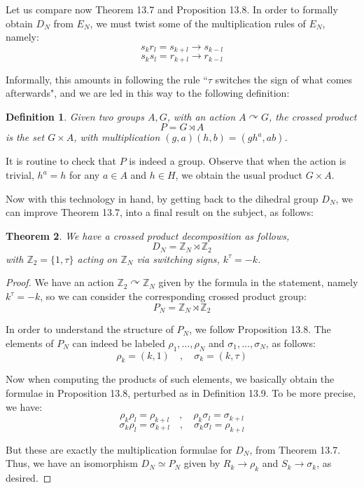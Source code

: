 \documentclass[12pt]{amsbook}
\newtheorem{theorem}{Theorem}[chapter]
\newtheorem{definition}[theorem]{Definition}
\begin{document}
Let us compare now Theorem 13.7 and Proposition 13.8. In order to formally obtain $D_N$ from $E_N$, we must twist some of the multiplication rules of $E_N$, namely:
$$s_kr_l=s_{k+l}\to s_{k-l}$$
$$s_ks_l=r_{k+l}\to r_{k-l}$$

Informally, this amounts in following the rule ``$\tau$ switches the sign of what comes afterwards", and we are led in this way to the following definition:


\begin{definition}
Given two groups $A,G$, with an action $A\curvearrowright G$, the crossed product
$$P=G\rtimes A$$
is the set $G\times A$, with multiplication $(g,a)(h,b)=(gh^a,ab)$.
\end{definition}

It is routine to check that $P$ is indeed a group. Observe that when the action is trivial, $h^a=h$ for any $a\in A$ and $h\in H$, we obtain the usual product $G\times A$. 

\bigskip

Now with this technology in hand, by getting back to the dihedral group $D_N$, we can improve Theorem 13.7, into a final result on the subject, as follows:


\begin{theorem}
We have a crossed product decomposition as follows,
$$D_N=\mathbb Z_N\rtimes\mathbb Z_2$$
with $\mathbb Z_2=\{1,\tau\}$ acting on $\mathbb Z_N$ via switching signs, $k^\tau=-k$.
\end{theorem}

\begin{proof}
We have an action $\mathbb Z_2\curvearrowright\mathbb Z_N$ given by the formula in the statement, namely $k^\tau=-k$, so we can consider the corresponding crossed product group:
$$P_N=\mathbb Z_N\rtimes\mathbb Z_2$$

In order to understand the structure of $P_N$, we follow Proposition 13.8. The elements of $P_N$ can indeed be labeled $\rho_1,\ldots,\rho_N$ and $\sigma_1,\ldots,\sigma_N$, as follows:
$$\rho_k=(k,1)\quad,\quad 
\sigma_k=(k,\tau)$$

Now when computing the products of such elements, we basically obtain the formulae in Proposition 13.8, perturbed as in Definition 13.9. To be more precise, we have:
$$\rho_k\rho_l=\rho_{k+l}\quad,\quad 
\rho_k\sigma_l=\sigma_{k+l}$$
$$\sigma_k\rho_l=\sigma_{k+l}\quad,\quad
\sigma_k\sigma_l=\rho_{k+l}$$

But these are exactly the multiplication formulae for $D_N$, from Theorem 13.7. Thus, we have an isomorphism $D_N\simeq P_N$ given by $R_k\to\rho_k$ and $S_k\to\sigma_k$, as desired.
\end{proof}
\end{document}

